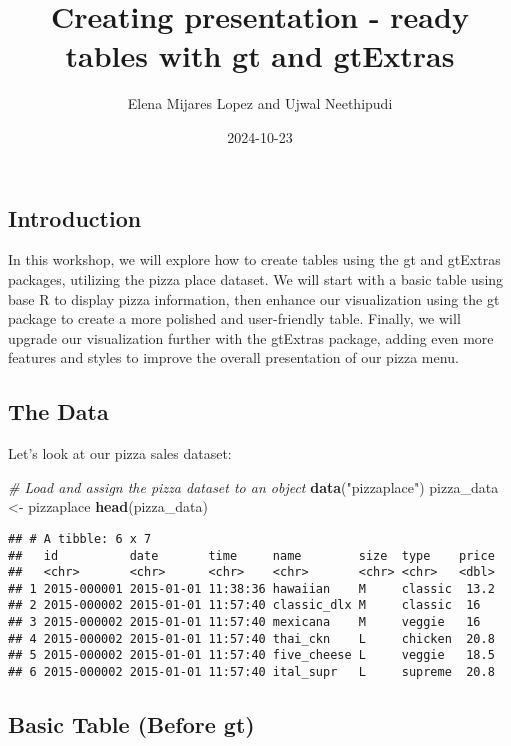 \documentclass[
]{article}
\title{Creating presentation - ready tables with gt and gtExtras}
\author{Elena Mijares Lopez and Ujwal Neethipudi}
\date{2024-10-23}
\newenvironment{Shaded}{\begin{snugshade}}{\end{snugshade}}
\newcommand{\CommentTok}[1]{\textcolor[rgb]{0.56,0.35,0.01}{\textit{#1}}}
\newcommand{\FunctionTok}[1]{\textcolor[rgb]{0.13,0.29,0.53}{\textbf{#1}}}
\newcommand{\NormalTok}[1]{#1}
\newcommand{\OtherTok}[1]{\textcolor[rgb]{0.56,0.35,0.01}{#1}}
\newcommand{\StringTok}[1]{\textcolor[rgb]{0.31,0.60,0.02}{#1}}
\begin{document}
\maketitle

{
\setcounter{tocdepth}{2}
\tableofcontents
}
\subsection{Introduction}\label{introduction}

In this workshop, we will explore how to create tables using the gt and
gtExtras packages, utilizing the pizza place dataset. We will start with
a basic table using base R to display pizza information, then enhance
our visualization using the gt package to create a more polished and
user-friendly table. Finally, we will upgrade our visualization further
with the gtExtras package, adding even more features and styles to
improve the overall presentation of our pizza menu.

\subsection{The Data}\label{the-data}

Let's look at our pizza sales dataset:

\begin{Shaded}
\begin{Highlighting}[]
\CommentTok{\# Load and assign the pizza dataset to an object}
\FunctionTok{data}\NormalTok{(}\StringTok{"pizzaplace"}\NormalTok{)}
\NormalTok{pizza\_data }\OtherTok{\textless{}{-}}\NormalTok{ pizzaplace}
\FunctionTok{head}\NormalTok{(pizza\_data)}
\end{Highlighting}
\end{Shaded}

\begin{verbatim}
## # A tibble: 6 x 7
##   id          date       time     name        size  type    price
##   <chr>       <chr>      <chr>    <chr>       <chr> <chr>   <dbl>
## 1 2015-000001 2015-01-01 11:38:36 hawaiian    M     classic  13.2
## 2 2015-000002 2015-01-01 11:57:40 classic_dlx M     classic  16  
## 3 2015-000002 2015-01-01 11:57:40 mexicana    M     veggie   16  
## 4 2015-000002 2015-01-01 11:57:40 thai_ckn    L     chicken  20.8
## 5 2015-000002 2015-01-01 11:57:40 five_cheese L     veggie   18.5
## 6 2015-000002 2015-01-01 11:57:40 ital_supr   L     supreme  20.8
\end{verbatim}

\subsection{Basic Table (Before gt)}\label{basic-table-before-gt}
\end{document}
